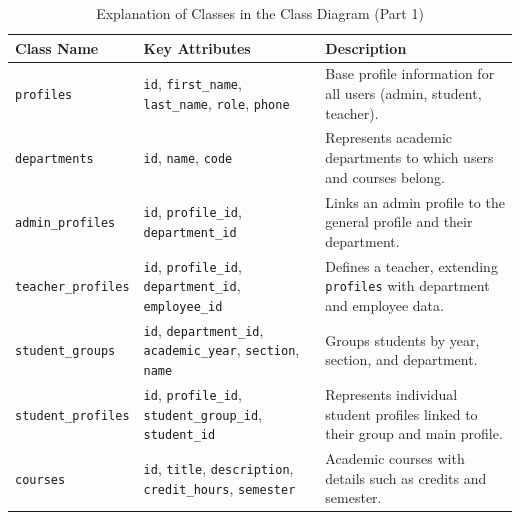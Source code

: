\documentclass[12pt,a4paper]{report}
\begin{document}
\begin{table}[H]
\centering
\small
\caption{Explanation of Classes in the Class Diagram (Part 1)}
\renewcommand{\arraystretch}{1.3}
\begin{tabular}{|p{3cm}|p{4cm}|p{7.5cm}|}
\hline
\textbf{Class Name} & \textbf{Key Attributes} & \textbf{Description} \\
\hline
\texttt{profiles} & \texttt{id}, \texttt{first\_name}, \texttt{last\_name}, \texttt{role}, \texttt{phone} & Base profile information for all users (admin, student, teacher). \\
\hline
\texttt{departments} & \texttt{id}, \texttt{name}, \texttt{code} & Represents academic departments to which users and courses belong. \\
\hline
\texttt{admin\_profiles} & \texttt{id}, \texttt{profile\_id}, \texttt{department\_id} & Links an admin profile to the general profile and their department. \\
\hline
\texttt{teacher\_profiles} & \texttt{id}, \texttt{profile\_id}, \texttt{department\_id}, \texttt{employee\_id} & Defines a teacher, extending \texttt{profiles} with department and employee data. \\
\hline
\texttt{student\_groups} & \texttt{id}, \texttt{department\_id}, \texttt{academic\_year}, \texttt{section}, \texttt{name} & Groups students by year, section, and department. \\
\hline
\texttt{student\_profiles} & \texttt{id}, \texttt{profile\_id}, \texttt{student\_group\_id}, \texttt{student\_id} & Represents individual student profiles linked to their group and main profile. \\
\hline
\texttt{courses} & \texttt{id}, \texttt{title}, \texttt{description}, \texttt{credit\_hours}, \texttt{semester} & Academic courses with details such as credits and semester. \\
\hline
\end{tabular}
\end{table}
\end{document}
